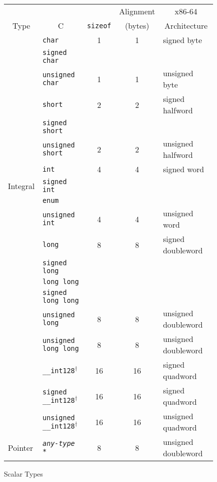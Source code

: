 \begin{figure}
  \caption{Scalar Types}\label{basic-types}
{ %
  \small
  \begin{tabular}{l|l|c|c|l}
    \hline\noalign{\smallskip}
     & &  & \multicolumn{1}{c|}{Alignment} & \multicolumn{1}{c|}{x86-64} \\
    \multicolumn{1}{c|}{Type} & \multicolumn{1}{c|}{C}
     &  \texttt{sizeof} & (bytes)
     & \multicolumn{1}{c|}{Architecture}  \\
    \hline
    & \texttt{char}        & 1 & 1 & signed byte \\
    & \texttt{signed char} & & \\
    \cline{2-5}
    & \texttt{unsigned char} & 1 & 1 & unsigned byte \\
    \cline{2-5}
    & \texttt{short} & 2 & 2 & signed halfword \\
    & \texttt{signed short} & & \\
    \cline{2-5}
    & \texttt{unsigned short} & 2 & 2 & unsigned halfword \\
    \cline{2-5}
    & \texttt{int} & 4 & 4 & signed word \\
    Integral & \texttt{signed int} & & \\
    & \texttt{enum} & & \\
    \cline{2-5}
    & \texttt{unsigned int} & 4 & 4 & unsigned word \\
    \cline{2-5}
    & \texttt{long} & 8 & 8 & signed doubleword \\
    & \texttt{signed long} & & \\
    & \texttt{long long} & & \\
    & \texttt{signed long long} & & \\
    \cline{2-5}
    & \texttt{unsigned long} & 8 & 8 & unsigned doubleword \\
    & \texttt{unsigned long long} & 8 & 8 & unsigned doubleword \\
    \hline
    & \texttt{__int128}$^\dagger$ & 16 & 16 & signed quadword \\
    & \texttt{signed __int128}$^\dagger$ & 16 & 16 & signed quadword \\
    \hline
    & \texttt{unsigned __int128}$^\dagger$ & 16 & 16 & unsigned quadword \\
    \hline
    Pointer & \texttt{\textit{any-type} *} & 8 & 8 & unsigned doubleword \\

\end{tabular}}
\end{figure}

